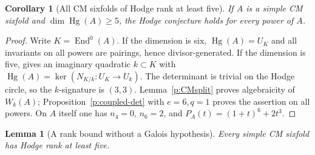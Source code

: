 \documentclass[11pt,reqno]{article}
\theoremstyle{emphasizedplain}
\newtheorem{lemma}[theorem]{Lemma}
\newtheorem{corollary}[theorem]{Corollary}
\theoremstyle{emphasizeddefinition}
\theoremstyle{emphasizeddefinition}
\DeclareMathOperator{\End}{End}
\DeclareMathOperator{\Hg}{Hg}
\begin{document}
\begin{corollary}[All CM sixfolds of Hodge rank at least five]
\label{p:CMrankfive}
If $A$ is a simple CM sixfold and $\dim\Hg(A)\ge5$, the Hodge
conjecture holds for every power of $A$.
\end{corollary}
\begin{proof}
Write $K=\End^0(A)$. If the dimension is six, $\Hg(A)=U_K$ and all
invariants on all powers are pairings, hence divisor-generated.
If the dimension is five, \cite[Lemma (3.7)]{MZ} gives an imaginary
quadratic $k\subset K$ with
$\Hg(A)=\ker(N_{K/k}:U_K\to U_k)$.
The determinant is trivial on the Hodge circle, so the $k$-signature
is $(3,3)$. Lemma~\ref{p:CMsplit} proves algebraicity of $W_k(A)$;
Proposition~\ref{p:coupled-det} with $e=6,q=1$ proves the assertion on all
powers. On $A$ itself one has $n_4=0$, $n_6=2$, and
$P_A(t)=(1+t)^6+2t^3$.
\end{proof}
\begin{lemma}[A rank bound without a Galois hypothesis]\label{p:CMsixrank}
Every simple CM sixfold has Hodge rank at least five.
\end{lemma}
\end{document}

